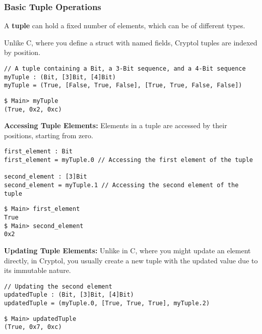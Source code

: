 \subsubsection{Basic Tuple Operations}
\begin{tcolorbox}[colframe=defcolor,title={\color{white}\bf Tuple}]
A \textbf{tuple} can hold a fixed number of elements, which can be of different types.
\end{tcolorbox}
\begin{remark}
Unlike C, where you define a struct with named fields, Cryptol tuples are indexed by position.
\end{remark}
\begin{lstlisting}[style=cryptol]
// A tuple containing a Bit, a 3-Bit sequence, and a 4-Bit sequence
myTuple : (Bit, [3]Bit, [4]Bit)
myTuple = (True, [False, True, False], [True, True, False, False])
\end{lstlisting}
\begin{lstlisting}[style=zsh]
$ Main> myTuple
(True, 0x2, 0xc)
\end{lstlisting}
\vspace{16pt}
\newpage
\noindent\textbf{Accessing Tuple Elements:} Elements in a tuple are accessed by their positions, starting from zero.
\begin{lstlisting}[style=cryptol]
first_element : Bit
first_element = myTuple.0 // Accessing the first element of the tuple

second_element : [3]Bit
second_element = myTuple.1 // Accessing the second element of the tuple
\end{lstlisting}
\begin{lstlisting}[style=zsh]
$ Main> first_element
True
$ Main> second_element
0x2
\end{lstlisting}
\vspace{16pt}
\textbf{Updating Tuple Elements:} Unlike in C, where you might update an element directly, in Cryptol, you usually create a new tuple with the updated value due to its immutable nature.
\begin{lstlisting}[style=cryptol]
// Updating the second element
updatedTuple : (Bit, [3]Bit, [4]Bit)
updatedTuple = (myTuple.0, [True, True, True], myTuple.2)
\end{lstlisting}
\begin{lstlisting}[style=zsh]
$ Main> updatedTuple
(True, 0x7, 0xc)
\end{lstlisting}

